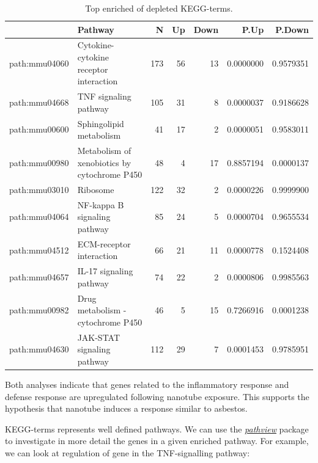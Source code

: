 \documentclass[9pt,a4paper,]{extarticle}
\begin{document}
\begin{table}[t]

\caption{\label{tab:kegga}Top enriched of depleted KEGG-terms.}
\centering
\begin{tabular}{l|l|r|r|r|r|r}
\hline
  & Pathway & N & Up & Down & P.Up & P.Down\\
\hline
path:mmu04060 & Cytokine-cytokine receptor interaction & 173 & 56 & 13 & 0.0000000 & 0.9579351\\
\hline
path:mmu04668 & TNF signaling pathway & 105 & 31 & 8 & 0.0000037 & 0.9186628\\
\hline
path:mmu00600 & Sphingolipid metabolism & 41 & 17 & 2 & 0.0000051 & 0.9583011\\
\hline
path:mmu00980 & Metabolism of xenobiotics by cytochrome P450 & 48 & 4 & 17 & 0.8857194 & 0.0000137\\
\hline
path:mmu03010 & Ribosome & 122 & 32 & 2 & 0.0000226 & 0.9999900\\
\hline
path:mmu04064 & NF-kappa B signaling pathway & 85 & 24 & 5 & 0.0000704 & 0.9655534\\
\hline
path:mmu04512 & ECM-receptor interaction & 66 & 21 & 11 & 0.0000778 & 0.1524408\\
\hline
path:mmu04657 & IL-17 signaling pathway & 74 & 22 & 2 & 0.0000806 & 0.9985563\\
\hline
path:mmu00982 & Drug metabolism - cytochrome P450 & 46 & 5 & 15 & 0.7266916 & 0.0001238\\
\hline
path:mmu04630 & JAK-STAT signaling pathway & 112 & 29 & 7 & 0.0001453 & 0.9785951\\
\hline
\end{tabular}
\end{table}

Both analyses indicate that genes related to the inflammatory response and defense response are upregulated following nanotube exposure. This supports the hypothesis that nanotube induces a response similar to asbestos.

KEGG-terms represents well defined pathways. We can use the \emph{\href{https://bioconductor.org/packages/3.8/pathview}{pathview}} package\citep{Luo2013} to investigate in more detail the genes in a given enriched pathway. For example, we can look at regulation of gene in the TNF-signalling pathway:
\end{document}
